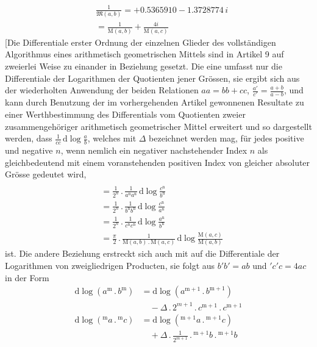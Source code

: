\endgroup
\[
\begin{aligned}&\frac{1}{\mathfrak{M}(a,b)}=+0.5365910-1.3728774\,i\\&=\frac{1}{\mathrm{M}(a,b)}+\frac{4i}{\mathrm{M}(a,c)}\end{aligned}
\]
[Die Differentiale erster Ordnung der einzelnen Glieder des vollständigen Algorithmus eines arithmetisch geometrischen Mittels sind in Artikel 9 auf zweierlei Weise zu einander in Beziehung gesetzt. Die eine umfasst nur die Differentiale der Logarithmen der Quotienten jener Grössen, sie ergibt sich aus der wiederholten Anwendung der beiden Relationen $aa=bb+cc$, $\frac{a'}{c'}=\frac{a+b}{a-b}$, und kann durch Benutzung der im vorhergehenden Artikel gewonnenen Resultate zu einer Werthbestimmung des Differentials vom Quotienten zweier zusammengehöriger arithmetisch geometrischer Mittel erweitert und so dargestellt werden, dass $\frac{1}{cc}\,\mathrm{d}\log\frac{a}{b}$, welches mit $\Delta$ bezeichnet werden mag, für jedes positive und negative $n$, wenn nemlich ein negativer nachstehender Index $n$ als gleichbedeutend mit einem voranstehenden positiven Index von gleicher absoluter Grösse gedeutet wird,
\[
\begin{aligned}&\\&=\frac{1}{2^{n}}\mathbin{.}\frac{1}{a^{\mathrm{n}}a^{\mathrm{n}}}\,\mathrm{d}\log\frac{c^{\mathrm{n}}}{b^{\mathrm{n}}}\\&=\frac{1}{2^{n}}\mathbin{.}\frac{1}{b^{\mathrm{n}}b^{\mathrm{n}}}\,\mathrm{d}\log\frac{c^{\mathrm{n}}}{a^{\mathrm{n}}}\\&=\frac{1}{2^{n}}\mathbin{.}\frac{1}{c^{\mathrm{n}}c^{\mathrm{n}}}\,\mathrm{d}\log\frac{a^{\mathrm{n}}}{b^{\mathrm{n}}}\\&=\frac{\pi}{2}\mathbin{.}\frac{1}{\mathrm{M}(a,b)\mathbin{.}\mathrm{M}(a,c)}\,\mathrm{d}\log\frac{\mathrm{M}(a,c)}{\mathrm{M}(a,b)}\end{aligned}
\]
ist. Die andere Beziehung erstreckt sich auch mit auf die Differentiale der Logarithmen von zweigliedrigen Producten, sie folgt aus $b'b'=ab$ und ${}'c{}'c=4ac$ in der Form
\[
\begin{aligned}
\mathrm{d}\log(a^{\mathrm{m}}\mathbin{.} b^{\mathrm{m}})&=\mathrm{d}\log(a^{\mathrm{m}+1}\mathbin{.} b^{\mathrm{m}+1})\\&\quad-\Delta\mathbin{.}2^{m+1}\mathbin{.} c^{\mathrm{m}+1}\mathbin{.} c^{\mathrm{m}+1}\\[3pt]
\mathrm{d}\log({}^{\mathrm{m}}a\mathbin{.}{}^{\mathrm{m}}c)&=\mathrm{d}\log({}^{\mathrm{m}+1}a\mathbin{.}{}^{\mathrm{m}+1}c)\\&\quad+\Delta\mathbin{.}\frac{1}{2^{m+1}}\mathbin{.}{}^{\mathrm{m}+1}b\mathbin{.}{}^{\mathrm{m}+1}b
\end{aligned}
\]
